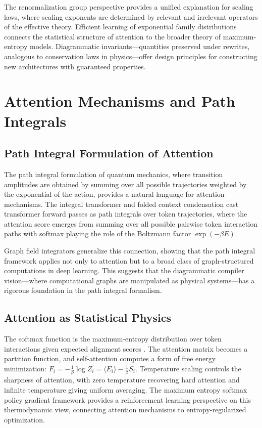 \documentclass[12pt,a4paper]{article}
\begin{document}
The renormalization group perspective provides a unified explanation for scaling laws, where scaling exponents are determined by relevant and irrelevant operators of the effective theory. Efficient learning of exponential family distributions \cite{shah2023on} connects the statistical structure of attention to the broader theory of maximum-entropy models. Diagrammatic invariants---quantities preserved under rewrites, analogous to conservation laws in physics---offer design principles for constructing new architectures with guaranteed properties.

\section{Attention Mechanisms and Path Integrals}
\subsection{Path Integral Formulation of Attention}

The path integral formulation of quantum mechanics, where transition amplitudes are obtained by summing over all possible trajectories weighted by the exponential of the action, provides a natural language for attention mechanisms. The integral transformer \cite{integral2025integral} and folded context condensation \cite{paeng2025folded} cast transformer forward passes as path integrals over token trajectories, where the attention score emerges from summing over all possible pairwise token interaction paths with softmax playing the role of the Boltzmann factor $\exp(-\beta E)$. 

Graph field integrators \cite{choromanski2026graph} generalize this connection, showing that the path integral framework applies not only to attention but to a broad class of graph-structured computations in deep learning. This suggests that the diagrammatic compiler vision---where computational graphs are manipulated as physical systems---has a rigorous foundation in the path integral formalism.

\subsection{Attention as Statistical Physics}

The softmax function is the maximum-entropy distribution over token interactions given expected alignment scores \cite{granziol2019meme}. The attention matrix becomes a partition function, and self-attention computes a form of free energy minimization: $F_i = -\frac{1}{\beta} \log Z_i = \langle E_i \rangle - \frac{1}{\beta} S_i$. Temperature scaling controls the sharpness of attention, with zero temperature recovering hard attention and infinite temperature giving uniform averaging. The maximum entropy softmax policy gradient framework \cite{choe2025maximum} provides a reinforcement learning perspective on this thermodynamic view, connecting attention mechanisms to entropy-regularized optimization.
\end{document}
